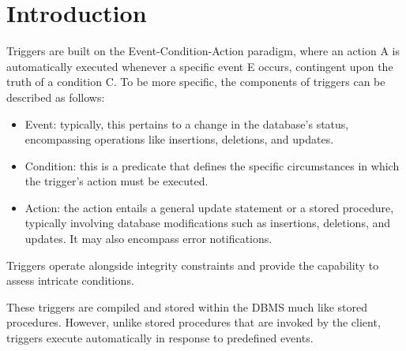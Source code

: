 \section{Introduction}

Triggers are built on the Event-Condition-Action paradigm, where an action A is automatically executed whenever a specific event E occurs, contingent upon the truth of a condition C.
To be more specific, the components of triggers can be described as follows:
\begin{itemize}
    \item Event: typically, this pertains to a change in the database's status, encompassing operations like insertions, deletions, and updates.
    \item Condition: this is a predicate that defines the specific circumstances in which the trigger's action must be executed.
    \item Action: the action entails a general update statement or a stored procedure, typically involving database modifications such as insertions, deletions, and updates. 
        It may also encompass error notifications.
\end{itemize}

Triggers operate alongside integrity constraints and provide the capability to assess intricate conditions. 

These triggers are compiled and stored within the DBMS much like stored procedures. 
However, unlike stored procedures that are invoked by the client, triggers execute automatically in response to predefined events.
